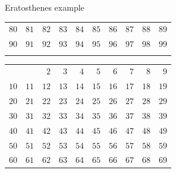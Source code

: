 \documentclass{beamer}
\begin{document}
\begin{frame}[plain]{Eratosthenes example}
{\begin{tabular}{r r r r r r r r r r}
			\color{black} $80$ & \color{black} $81$ & \color{black} $82$ & \color{black} $83$ & \color{black} $84$ & \color{black} $85$ & \color{black} $86$ & \color{black} $87$ & \color{black} $88$ & \color{black} $89$\\
			\color{black} $90$ & \color{black} $91$ & \color{black} $92$ & \color{black} $93$ & \color{black} $94$ & \color{black} $95$ & \color{black} $96$ & \color{black} $97$ & \color{black} $98$ & \color{black} $99$\\
			\phantom{$888$} & \phantom{$888$} & \phantom{$888$} & \phantom{$888$} & \phantom{$888$} & \phantom{$888$} & \phantom{$888$} & \phantom{$888$} & \phantom{$888$} & \phantom{$888$}
        \end{tabular}
	}
	 {
		\begin{tabular}{r r r r r r r r r r}
			                   &                    & \color{ blue}  $2$ & \color{black}  $3$ & \color{  red}  $4$ & \color{black}  $5$ & \color{  red}  $6$ & \color{black}  $7$ & \color{  red}  $8$ & \color{black}  $9$\\
			\color{  red} $10$ & \color{black} $11$ & \color{  red} $12$ & \color{black} $13$ & \color{  red} $14$ & \color{black} $15$ & \color{  red} $16$ & \color{black} $17$ & \color{  red} $18$ & \color{black} $19$\\
			\color{  red} $20$ & \color{black} $21$ & \color{  red} $22$ & \color{black} $23$ & \color{  red} $24$ & \color{black} $25$ & \color{  red} $26$ & \color{black} $27$ & \color{  red} $28$ & \color{black} $29$\\
			\color{  red} $30$ & \color{black} $31$ & \color{  red} $32$ & \color{black} $33$ & \color{  red} $34$ & \color{black} $35$ & \color{  red} $36$ & \color{black} $37$ & \color{  red} $38$ & \color{black} $39$\\
			\color{  red} $40$ & \color{black} $41$ & \color{  red} $42$ & \color{black} $43$ & \color{  red} $44$ & \color{black} $45$ & \color{  red} $46$ & \color{black} $47$ & \color{  red} $48$ & \color{black} $49$\\
			\color{  red} $50$ & \color{black} $51$ & \color{  red} $52$ & \color{black} $53$ & \color{  red} $54$ & \color{black} $55$ & \color{  red} $56$ & \color{black} $57$ & \color{  red} $58$ & \color{black} $59$\\
			\color{  red} $60$ & \color{black} $61$ & \color{  red} $62$ & \color{black} $63$ & \color{  red} $64$ & \color{black} $65$ & \color{  red} $66$ & \color{black} $67$ & \color{  red} $68$ & \color{black} $69$\\

\end{tabular}}
\end{frame}
\end{document}
